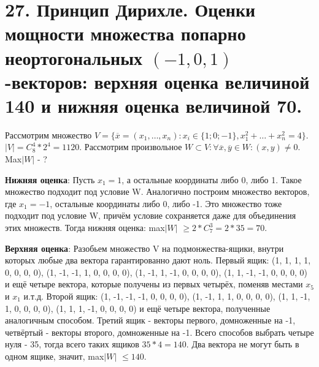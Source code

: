 \section*{27. Принцип Дирихле. Оценки мощности множества попарно неортогональных $(-1, 0, 1)$-векторов: верхняя оценка величиной 140 и нижняя оценка величиной 70.}
Рассмотрим множество $V = \{ \overline{x} = (x_1, \dots, x_n) : x_i \in \{1; 0; -1 \}, x_1^2 + \dots + x_n^2 = 4\}$. $|V| = C_8^4*2^4 = 1120$. Рассмотрим произвольное $W \subset V: \forall \overline{x}, \overline{y} \in W: (x, y) \neq 0$. Max$|W|$ - ? \\ \par
\textbf{Нижняя оценка}: Пусть $x_1 = 1$, а остальные координаты либо 0, либо 1. Такое множество подходит под условие W. Аналогично построим множество векторов, где $x_1 = -1$, остальные координаты либо 0, либо -1. Это множество тоже подходит под условие W, причём условие сохраняется даже для объединения этих множеств. Тогда нижняя оценка: max$|W|$ $\geqslant 2*C_7^3 = 2*35 = 70$. \\ \par
\textbf{Верхняя оценка}: Разобьем множество V на подмонжества-ящики, внутри которых любые два вектора гарантированно дают ноль. Первый ящик: (1, 1, 1, 1, 0, 0, 0, 0), (1, -1, -1, 1, 0, 0, 0, 0), (1, -1, 1, -1, 0, 0, 0, 0), (1, 1, -1, -1, 0, 0, 0, 0) и ещё четыре вектора, которые получены из первых четырёх, поменяв местами $x_5$ и $x_1$ и.т.д. Второй ящик: (1, -1, -1, -1, 0, 0, 0, 0), (1, -1, 1, 1, 0, 0, 0, 0), (1, 1, -1, 1, 0, 0, 0, 0), (1, 1, 1, -1, 0, 0, 0, 0) и ещё четыре вектора, полученные аналогичным способом. Третий ящик - векторы первого, домноженные на -1, четвёртый - векторы второго, домноженные на -1. Всего способов выбрать четыре нуля - 35, тогда всего таких ящиков $35*4 = 140$. Два вектора не могут быть в одном ящике, значит, max$|W|$ $\leqslant 140$.